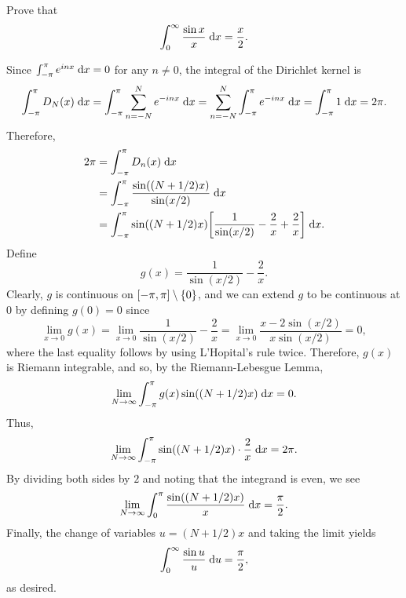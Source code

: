 \begin{exrc}[12]
    Prove that
    \begin{equation*}
        \int_{0}^{\infty} \frac{\sin x}{x} \;\mathrm d x = \frac{x}{2}.
    \end{equation*}

\begin{soln}
    Since \(\int_{-\pi}^{\pi} e^{inx} \;\mathrm d x = 0\) for any \(n \neq 0\),
    the integral of the Dirichlet kernel is
    \begin{equation*}
        \int_{-\pi}^{\pi} D_N(x) \;\mathrm d x
        = \int_{-\pi}^{\pi} \sum_{n = -N}^{N} e^{-inx} \;\mathrm d x
        = \sum_{n = -N}^{N} \int_{-\pi}^{\pi} e^{-inx} \;\mathrm d x
        = \int_{-\pi}^{\pi} 1 \;\mathrm d x
        = 2\pi.
    \end{equation*}
    Therefore,
    \begin{align*}
        2\pi 
        &= \int_{-\pi}^{\pi} D_n(x) \ud x \\
        &= \int_{-\pi}^{\pi} \frac{\sin((N + 1 / 2)x)}{\sin(x / 2)} \ud x \\
        &= \int_{-\pi}^{\pi} \sin\br{(N + 1/2)x} \sqbr{\frac{1}{\sin(x/2)} 
        - \frac{2}{x} + \frac{2}{x}} \ud x.
    \end{align*}
    Define
    \begin{equation*}
        g(x) = \frac{1}{\sin(x / 2)} - \frac{2}{x}.
    \end{equation*}
    Clearly, \(g\) is continuous on \([-\pi, \pi] \setminus \set{0}\),
    and we can extend \(g\) to be continuous at 0 by defining \(g(0) = 0\) since
    \begin{equation*}
        \lim_{x \to 0} g(x)
        = \lim_{x \to 0} \frac{1}{\sin(x / 2)} - \frac{2}{x}
        = \lim_{x \to 0} \frac{x - 2\sin(x / 2)}{x \sin(x / 2)}
        = 0,
    \end{equation*}
    where the last equality follows by using L'Hopital's rule twice.
    Therefore, \(g(x)\) is Riemann integrable, and so, by the Riemann-Lebesgue Lemma,
    \begin{equation*}
        \lim_{N \to \infty} \int_{-\pi}^{\pi} g(x) \sin((N + 1 / 2)x) \;\mathrm d x = 0.
    \end{equation*}
    Thus,
    \begin{equation*}
        \lim_{N \to \infty} \int_{-\pi}^{\pi} \sin((N + 1/2)x) \cdot \frac{2}{x} \;\mathrm d x = 2\pi.
    \end{equation*}
    By dividing both sides by \(2\) and noting that the integrand is even, we see
    \begin{equation*}
        \lim_{N \to \infty} \int_{0}^{\pi} \frac{\sin((N + 1/2)x)}{x} \;\mathrm d x = \frac{\pi}{2}.
    \end{equation*}
    Finally, the change of variables \(u = (N + 1/2)x\) and taking the limit yields
    \begin{equation*}
        \int_{0}^{\infty} \frac{\sin u}{u} \;\mathrm d u = \frac{\pi}{2},
    \end{equation*}
    as desired.


\end{soln}
\end{exrc}
